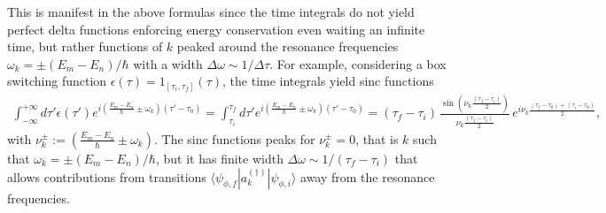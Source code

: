\documentclass[../QFT_main.tex]{subfiles}
\begin{document}
\begin{mytheorem}
This is manifest in the above formulas since the time integrals do not yield perfect delta functions enforcing energy conservation even waiting an infinite time, but rather functions of $k$ peaked around the resonance frequencies $\omega_k = \pm (E_m - E_n)/\hbar$ with a width $\Delta \omega \sim 1/\Delta\tau$.
For example, considering a box switching function $\epsilon(\tau) = 1_{[\tau_i,\tau_f]}(\tau)$, the time integrals yield sinc functions 
\begin{align}
    \int_{-\infty}^{+\infty}\!\!\!\! d\tau' \epsilon(\tau') e^{i \left(\tfrac{E_m-E_n}{\hbar} \pm\omega_k \right) (\tau'-\tau_0)}
    \!= \!\!\int_{\tau_i}^{\tau_f} \!\!\!d\tau' e^{i \left(\tfrac{E_m-E_n}{\hbar} \pm\omega_k \right) (\tau'-\tau_0)}
    \!=\! (\tau_f\!-\!\tau_i)\,\frac{\sin\left( \nu_k\frac{(\tau_f-\tau_i)}{2}\right)}{ \nu_k\frac{(\tau_f-\tau_i)}{2}}\, e^{i\nu_k\frac{(\tau_f-\tau_0)+(\tau_i-\tau_0)}{2}},
\end{align}
with $\nu_k^{\pm} := \left(\frac{E_m-E_n}{\hbar} \pm \omega_k\right)$.
The sinc functions peaks for $\nu_k^\pm=0$, that is $k$ such that $\omega_k = \pm (E_m - E_n)/\hbar$, but it has finite width $\Delta \omega \sim 1/(\tau_f-\tau_i)$ that allows contributions from transitions $\langle \psi_{\phi,f} | a_k^{(\dagger)}| \psi_{\phi,i}\rangle$ away from the resonance frequencies.
\medskip




\end{mytheorem}
\end{document}
